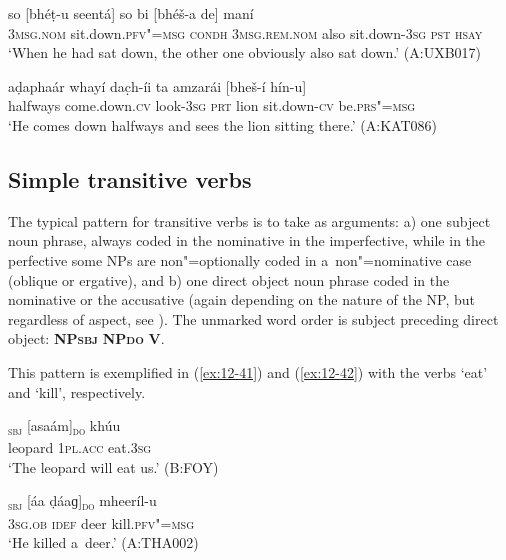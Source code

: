 \begin{exe}
\ex
\label{ex:12-39}
\gll so [bhéṭ-u seentá] so bi [bhéš-a de] maní \\
\textsc{3msg.nom} sit.down.\textsc{pfv"=msg} \textsc{condh} \textsc{3msg.rem.nom} also  sit.down-\textsc{3sg} \textsc{pst } \textsc{hsay} \\
\glt `When he had sat down, the other one obviously also sat down.' (A:UXB017)

\ex
\label{ex:12-40}
\gll aḍaphaár whayí dac̣h-íi ta amzarái [bheš-í hín-u] \\
halfways come.down.\textsc{cv} look-\textsc{3sg } \textsc{prt} lion sit.down-\textsc{cv} be.\textsc{prs"=msg} \\
\glt `He comes down halfways and sees the lion sitting there.' (A:KAT086)
\end{exe}

\subsection{Simple transitive verbs}
\label{subsec:12-2-3}


The typical pattern for transitive verbs is to take as arguments: a) one subject noun phrase, always coded in the nominative in the imperfective, while in the perfective some NPs are non"=optionally coded in a~non"=nominative case (oblique or ergative), and b) one direct object noun phrase coded in the nominative or the accusative (again depending on the nature of the NP, but regardless of aspect, see ). The unmarked word order is subject preceding direct object: \textbf{NP\textsc{sbj}} \textbf{NP\textsc{do}} \textbf{V}.


This pattern is exemplified in (\ref{ex:12-41}) and (\ref{ex:12-42}) with the verbs `eat' and `kill', respectively.

\begin{exe}
\ex
\label{ex:12-41}
\gll [karáaṛu]\textsubscript{\textsc{sbj}} [asaám]\textsubscript{\textsc{do}} khúu \\
leopard \textsc{1pl.acc} eat.3\textsc{sg} \\
\glt `The leopard will eat us.' (B:FOY)
\end{exe}
\begin{exe}
\ex
\label{ex:12-42}
\gll [tíi]\textsubscript{\textsc{sbj}} [áa ḍáaɡ]\textsubscript{\textsc{do}} mheeríl-u \\
\textsc{3sg.ob} \textsc{idef} deer kill.\textsc{pfv"=msg} \\
\glt `He killed a~deer.' (A:THA002)
\end{exe}

